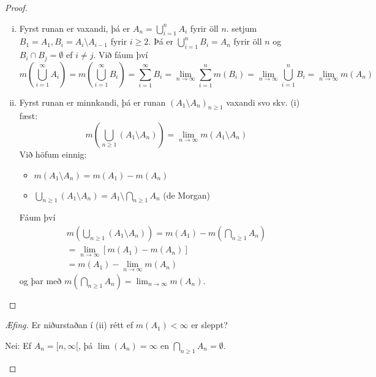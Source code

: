 \documentclass[12pt]{book} \usepackage[utf8]{inputenc}
\begin{document}
        \begin{proof}
          \begin{enumerate}[(i)]
          \item Fyrst runan er vaxandi, þá er
            $A_n = \bigcup_{i=1}^{n} A_i$ fyrir öll $n$. setjum
            $B_1 = A_1, B_i = A_i \setminus A_{i-1}$ fyrir
            $i \geq 2$.  Þá er $\bigcup_{i=1}^n B_i = A_n$ fyrir
            öll $n$ og $B_i \cap B_j = \emptyset$ ef $i \neq
            j$. Við fáum því
            \[ m(\bigcup_{i=1}^{\infty} A_i) =
            m(\bigcup_{i=1}^{\infty} B_i) = \sum_{i=1}^{\infty}
            B_i = \lim_{n \to \infty} \sum_{i =1}^n m(B_i) =
            \lim_{n \to \infty} \bigcup_{i=1}^n B_i = \lim_{n \to
              \infty} m(A_n)\]

          \item Fyrst runan er minnkandi, þá er runan
            $(A_1 \setminus A_n)_{n \geq 1}$ vaxandi svo skv. (i)
            fæst:
            \[m(\bigcup_{n\geq 1} (A_1 \setminus A_n)) = \lim_{n
              \to \infty} m(A_1 \setminus A_n)\] Við höfum einnig:
            \begin{itemize}
            \item $m(A_1 \setminus A_n) = m(A_1) - m(A_n)$
            \item
              $\bigcup_{n \geq 1} (A_1 \setminus A_n) = A_1
              \setminus \bigcap_{n \geq 1} A_n$ (de Morgan)
            \end{itemize}
            Fáum því
            \begin{gather*}
              m(\bigcup_{n \geq 1} (A_1 \setminus A_n))
              = m(A_1) - m(\bigcap_{n \geq 1} A_n)\\
              = \lim_{n \to \infty} [m(A_1) - m(A_n)]\\
              = m(A_1) - \lim_{n \to \infty} m(A_n)
            \end{gather*}
            og þar með
            $m(\bigcap_{n \geq 1} A_n) = \lim_{n \to \infty}
            m(A_n)$.
          \end{enumerate}
        \end{proof}

\begin{proof}[Æfing]
  Er niðurstaðan í (ii) rétt ef $m(A_1) < \infty$ er sleppt?
  \begin{lausn}
    Nei: Ef $A_n = [n, \infty[$, þá $\lim (A_n) = \infty$ en
    $\bigcap_{n \geq 1} A_n = \emptyset$.
  \end{lausn}
\end{proof}
\end{document}
